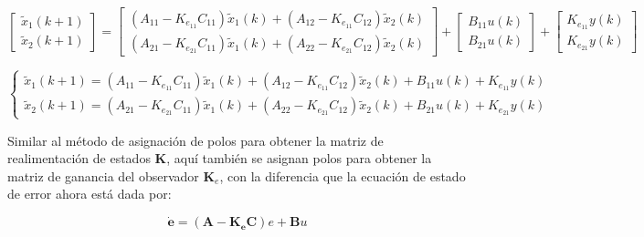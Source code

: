 \vspace{-0.5cm}
\begin{equation}
    \begin{bmatrix}
        \tilde{x}_1(k+1) \\
        \tilde{x}_2(k+1)
    \end{bmatrix}
    =
    \begin{bmatrix}
        (A_{11} - K_{e_{11}} C_{11}) \tilde{x}_1(k) + (A_{12} - K_{e_{11}} C_{12}) \tilde{x}_2(k)\\
        (A_{21} - K_{e_{21}} C_{11}) \tilde{x}_1(k) + (A_{22} - K_{e_{21}} C_{12}) \tilde{x}_2(k)
    \end{bmatrix}
    +
    \begin{bmatrix}
        B_{11} u(k)\\
        B_{21} u(k)
    \end{bmatrix}
    +
    \begin{bmatrix}
        K_{e_{11}} y(k)\\
        K_{e_{21}} y(k)
    \end{bmatrix}
\end{equation}
\vspace{-0.5cm}

\vspace{-0.5cm}
\begin{equation}
    \begin{cases}
        \tilde{x}_1(k+1) = (A_{11} - K_{e_{11}} C_{11}) \tilde{x}_1(k) + (A_{12} - K_{e_{11}} C_{12}) \tilde{x}_2(k) + B_{11} u(k) + K_{e_{11}} y(k)
        \\
        \tilde{x}_2(k+1) = (A_{21} - K_{e_{21}} C_{11}) \tilde{x}_1(k) + (A_{22} - K_{e_{21}} C_{12}) \tilde{x}_2(k) + B_{21} u(k) + K_{e_{21}} y(k)
    \end{cases}
\end{equation}
\vspace{-0.5cm}

Similar al método de asignación de polos para obtener la matriz de realimentación de estados $\textbf{K}$, aquí también se asignan polos para obtener
la matriz de ganancia del observador $\textbf{K}_e$, con la diferencia que la ecuación de estado de error ahora está dada por:

\vspace{-0.5cm}
\begin{equation}
    \dot{\textbf{e}} = (\mathbf{A} - \mathbf{K_e} \mathbf{C}) e + \mathbf{B} u
\end{equation}
\vspace{-0.5cm}

